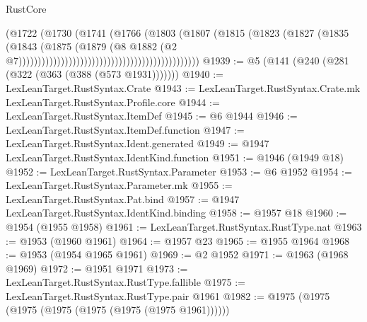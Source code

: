 \begin{lexlean}{RustCore}
\begin{coremodule}
                                                                    (@1722
                                                                      (@1730
                                                                        (@1741
                                                                          (@1766
                                                                            (@1803
                                                                              (@1807
                                                                                (@1815
                                                                                  (@1823
                                                                                    (@1827
                                                                                      (@1835
                                                                                        (@1843
                                                                                          (@1875
                                                                                            (@1879
                                                                                              (@8
                                                                                                @1882
                                                                                                (@2
                                                                                                  @7)))))))))))))))))))))))))))))))))))))))))))))))
@1939 := @5 (@141 (@240 (@281 (@322 (@363 (@388 (@573 @1931)))))))
@1940 := LexLeanTarget.RustSyntax.Crate
@1943 := LexLeanTarget.RustSyntax.Crate.mk LexLeanTarget.RustSyntax.Profile.core
@1944 := LexLeanTarget.RustSyntax.ItemDef
@1945 := @6 @1944
@1946 := LexLeanTarget.RustSyntax.ItemDef.function
@1947 := LexLeanTarget.RustSyntax.Ident.generated
@1949 := @1947 LexLeanTarget.RustSyntax.IdentKind.function
@1951 := @1946 (@1949 @18)
@1952 := LexLeanTarget.RustSyntax.Parameter
@1953 := @6 @1952
@1954 := LexLeanTarget.RustSyntax.Parameter.mk
@1955 := LexLeanTarget.RustSyntax.Pat.bind
@1957 := @1947 LexLeanTarget.RustSyntax.IdentKind.binding
@1958 := @1957 @18
@1960 := @1954 (@1955 @1958)
@1961 := LexLeanTarget.RustSyntax.RustType.nat
@1963 := @1953 (@1960 @1961)
@1964 := @1957 @23
@1965 := @1955 @1964
@1968 := @1953 (@1954 @1965 @1961)
@1969 := @2 @1952
@1971 := @1963 (@1968 @1969)
@1972 := @1951 @1971
@1973 := LexLeanTarget.RustSyntax.RustType.fallible
@1975 := LexLeanTarget.RustSyntax.RustType.pair @1961
@1982 := @1975 (@1975 (@1975 (@1975 (@1975 (@1975 (@1975 @1961))))))

\end{coremodule}
\end{lexlean}
